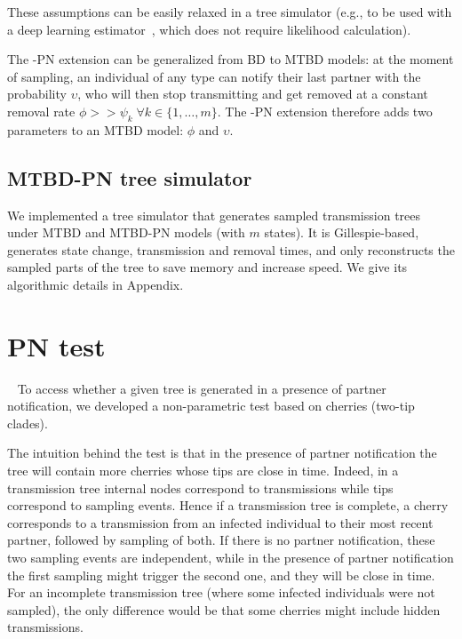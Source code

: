 \documentclass[a4paper,10pt]{article}
\begin{document}
These assumptions can be easily relaxed in a tree simulator (e.g., to be used with a deep learning estimator~\citep{Voznica2021}, which does not require likelihood calculation).


The -PN extension can be generalized from BD to MTBD models: at the moment of sampling, an individual of any type can notify their last partner with the probability $\upsilon$, who will then stop transmitting and get removed at a constant removal rate $\phi >> \psi_k \; \forall k \in \{1, \ldots, m\}$. The -PN extension therefore adds two parameters to an MTBD model: $\phi$ and $\upsilon$.

\subsection{MTBD-PN tree simulator}

We implemented a tree simulator that generates sampled transmission trees under MTBD and MTBD-PN models (with $m$ states). It is Gillespie-based, generates state change, transmission and removal times, and only reconstructs the sampled parts of the tree to save memory and increase speed.
We give its algorithmic details in Appendix. 



\section{PN test}~\label{sec:test}
To access whether a given tree is generated in a presence of partner notification, we developed a non-parametric test based on cherries (two-tip clades). 

The intuition behind the test is that in the presence of partner notification the tree will contain more cherries whose tips are close in time. Indeed, in a transmission tree internal nodes correspond to transmissions while tips correspond to sampling events. Hence if a transmission tree is complete, a cherry corresponds to a transmission from an infected individual to their most recent partner, followed by sampling of both. If there is no partner notification, these two sampling events are independent, while in the presence of partner notification the first sampling might trigger the second one, and they will be close in time. For an incomplete transmission tree (where some infected individuals were not sampled), the only difference would be that some cherries might include hidden transmissions.
\end{document}
